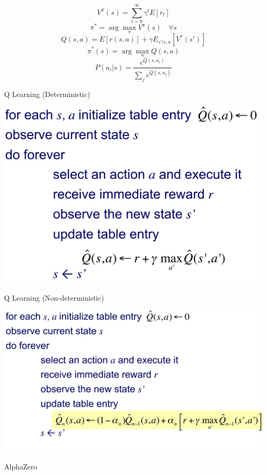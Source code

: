 \documentclass[10pt,landscape]{article}
\begin{document}
\begin{multicols}{4}
    \begin{equation*}
        V^{\pi} (s) = \sum_{t=0}^\infty \gamma^t E[r_t]
    \end{equation*}
    \begin{equation*}
        \pi^* = \arg \max_\pi V^\pi (s) \quad \forall s
    \end{equation*}
    \begin{equation*}
        Q(s,a) = E[r(s,a)] + \gamma E_{s'|s,a} [V^*(s')]
    \end{equation*}
    \begin{equation*}
        \pi^* (s) = \arg \max_a Q(s,a)
    \end{equation*}
    \begin{equation*}
        P(a_i|s) = \frac{c^{\hat{Q}(s,a_i)}}{\sum_j c^{\hat{Q}(s,a_j)}}
    \end{equation*}
    
    Q Learning (Deterministic)
    
    \includegraphics[width=0.65\linewidth]{snips/31_q-learning.jpg}

    Q Learning (Non-deterministic)
    
    \includegraphics[width=0.85\linewidth]{snips/32_q-learning-non-deterministic.jpg}

    AlphaZero
    

\end{multicols}
\end{document}
